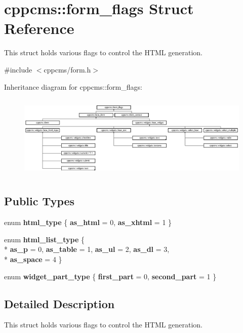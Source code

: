 \section{cppcms\+:\+:form\+\_\+flags Struct Reference}
\label{structcppcms_1_1form__flags}


This struct holds various flags to control the H\+T\+ML generation.  




{\ttfamily \#include $<$cppcms/form.\+h$>$}

Inheritance diagram for cppcms\+:\+:form\+\_\+flags\+:\begin{figure}[H]
\begin{center}
\leavevmode
\includegraphics[height=4.057971cm]{structcppcms_1_1form__flags}
\end{center}
\end{figure}
\subsection*{Public Types}
\begin{DoxyCompactItemize}
\item 
enum {\bf html\+\_\+type} \{ {\bf as\+\_\+html} = 0, 
{\bf as\+\_\+xhtml} = 1
 \}
\item 
enum {\bf html\+\_\+list\+\_\+type} \{ \\*
{\bf as\+\_\+p} = 0, 
{\bf as\+\_\+table} = 1, 
{\bf as\+\_\+ul} = 2, 
{\bf as\+\_\+dl} = 3, 
\\*
{\bf as\+\_\+space} = 4
 \}
\item 
enum {\bf widget\+\_\+part\+\_\+type} \{ {\bf first\+\_\+part} = 0, 
{\bf second\+\_\+part} = 1
 \}
\end{DoxyCompactItemize}


\subsection{Detailed Description}
This struct holds various flags to control the H\+T\+ML generation. 

